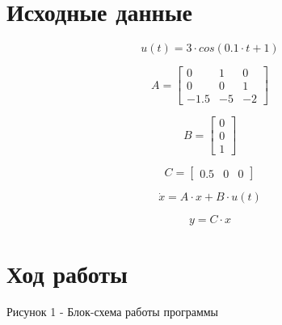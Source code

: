 \documentclass[14pt,a4paper]{extreport}
\begin{document}
\newpage
\chapter*{Исходные данные}

\begin{equation}
    u(t) = 3 \cdot  cos(0.1 \cdot t + 1)
\end{equation}

\begin{equation}
    A = 
    \begin{bmatrix} 
        0 & 1 & 0 \\ 
        0 & 0 & 1 \\
        -1.5 & -5 & -2
    \end{bmatrix}
\end{equation}

\begin{equation}
    B = 
    \begin{bmatrix} 
        0 \\ 
        0 \\
        1
    \end{bmatrix}
\end{equation}

\begin{equation}
    C = 
    \begin{bmatrix} 
        0.5 & 0 & 0
    \end{bmatrix}
\end{equation}

\begin{equation}
\dot x = A \cdot x + B \cdot u(t)
\end{equation}

\begin{equation}
y = C \cdot x
\end{equation}

\chapter*{Ход работы}

Рисунок 1 - Блок-схема работы программы
\end{document}
